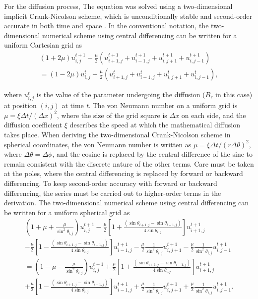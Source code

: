 For the diffusion process, The equation was solved using a two-dimensional implicit Crank-Nicolson scheme, which is unconditionally stable and second-order accurate in both time and space \citep{crank47}. In the conventional notation, the two-dimensional numerical scheme using central differencing can be written for a uniform Cartesian grid as 
\begin{eqnarray}
\nonumber\left(1+2\mu\right)u^{t+1}_{i,j}-\frac{\mu}{2}\left(u^{t+1}_{i+1,j}+u^{t+1}_{i-1,j}+u^{t+1}_{i,j+1}+u^{t+1}_{i,j-1}\right)\\
=\left(1-2\mu\right)u^{t}_{i,j}+\frac{\mu}{2}\left(u^{t}_{i+1,j}+u^{t}_{i-1,j}+u^{t}_{i,j+1}+u^{t}_{i,j-1}\right),
\end{eqnarray}

\noindent where $u^{t}_{i,j}$ is the value of the parameter undergoing the diffusion ($B_{r}$ in this case) at position $(i, j)$ at time \textit{t}. The von Neumann number on a uniform grid is $\mu=\xi{\Delta}t/\left({\Delta}x\right)^{2}$, where the size of the grid square is $\Delta x$ on each side, and the diffusion coefficient $\xi$ describes the speed at which the mathematical diffusion takes place. When deriving the two-dimensional Crank-Nicolson scheme in spherical coordinates, the von Neumann number is written as $\mu=\xi{\Delta}t/\left(r\Delta\theta\right)^{2}$, where $\Delta\theta=\Delta\phi$, and the cosine is replaced by the central difference of the sine to remain consistent with the discrete nature of the other terms. Care must be taken at the poles, where the central differencing is replaced by forward or backward differencing. To keep second-order accuracy with forward or backward differencing, the series must be carried out to higher-order terms in the derivation. The two-dimensional numerical scheme using central differencing can be written for a uniform spherical grid as \citep{crank47}
\begin{multline}
\left(1+\mu+\frac{\mu}{\sin^{2}\theta_{i,j}}\right)u^{t+1}_{i,j}-\frac{\mu}{2}\left[1+\frac{\left(\sin\theta_{i+1,j}-\sin\theta_{i-1,j}\right)}{4\sin\theta_{i,j}}\right]u^{t+1}_{i+1,j}\\
 -\frac{\mu}{2}\left[1-\frac{\left(\sin\theta_{i+1,j}-\sin\theta_{i-1,j}\right)}{4\sin\theta_{i,j}}\right]u^{t+1}_{i-1,j}-\frac{\mu}{2}\frac{1}{\sin^{2}\theta_{i,j}}u^{t+1}_{i,j+1}-\frac{\mu}{2}\frac{1}{\sin^{2}\theta_{i,j}}u^{t+1}_{i,j-1}\\
 =\left(1-\mu-\frac{\mu}{\sin^{2}\theta_{i,j}}\right)u^{t+1}_{i,j}+\frac{\mu}{2}\left[1+\frac{\left(\sin\theta_{i+1,j}-\sin\theta_{i-1,j}\right)}{4\sin\theta_{i,j}}\right]u^{t+1}_{i+1,j}\\
 +\frac{\mu}{2}\left[1-\frac{\left(\sin\theta_{i+1,j}-\sin\theta_{i-1,j}\right)}{4\sin\theta_{i,j}}\right]u^{t+1}_{i-1,j}+\frac{\mu}{2}\frac{1}{\sin^{2}\theta_{i,j}}u^{t+1}_{i,j+1}+\frac{\mu}{2}\frac{1}{\sin^{2}\theta_{i,j}}u^{t+1}_{i,j-1}.
 \label{CN Spherical}
\end{multline}

